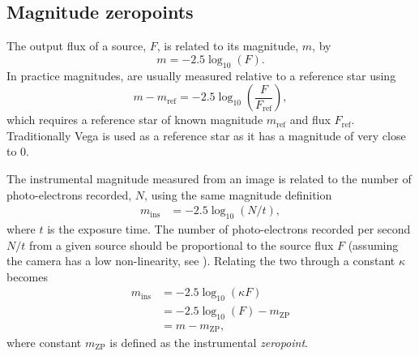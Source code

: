 \subsection{Magnitude zeropoints}
\label{sec:zeropoints}
\begin{colsection}

The output flux of a source, $F$, is related to its magnitude, $m$, by
%
\begin{equation}
    m = -2.5 \log_{10}(F).
    \label{eq:apparent_magnitude}
\end{equation}
%
In practice magnitudes, are usually measured relative to a reference star using
%
\begin{equation}
    m - m_\text{ref} = -2.5 \log_{10}\left(\frac{F}{F_\text{ref}}\right),
    \label{eq:magnitude_ref}
\end{equation}
%
which requires a reference star of known magnitude $m_\text{ref}$ and flux $F_\text{ref}$. Traditionally Vega is used as a reference star as it has a magnitude of very close to 0.

The instrumental magnitude measured from an image is related to the number of photo-electrons recorded, $N$, using the same magnitude definition
%
\begin{equation}
    \begin{split}
        m_\text{ins} & = -2.5 \log_{10}(N/t),
    \end{split}
    \label{eq:ins_mag}
\end{equation}
%
where $t$ is the exposure time. The number of photo-electrons recorded per second $N/t$ from a given source should be proportional to the source flux $F$ (assuming the camera has a low non-linearity, see ). Relating the two through a constant $\kappa$  becomes
%
\begin{equation}
    \begin{split}
        m_\text{ins} & = -2.5 \log_{10}\left(\kappa F\right) \\
                     & = -2.5 \log_{10}\left(F\right) - m_\text{ZP}    \\
                     & = m - m_\text{ZP},
    \end{split}
    \label{eq:ins_mag2}
\end{equation}
%
where constant $m_\text{ZP}$ is defined as the instrumental \emph{zeropoint}.


\end{colsection}
